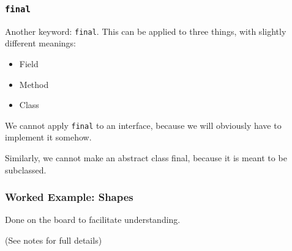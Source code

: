 \begin{frame}
\frametitle{\texttt{final}}
\begin{changemargin}{1cm}
Another keyword: \texttt{final}. This can be applied to three things, with slightly different meanings:
\begin{itemize}
	\item Field
	\item Method
	\item Class
\end{itemize}
We cannot apply \texttt{final} to an interface, because we will obviously have to implement it somehow. 

Similarly, we cannot make an abstract class final, because it is meant to be subclassed. 

\end{changemargin}
\end{frame}

\begin{frame}
\frametitle{Worked Example: Shapes}
\begin{changemargin}{1cm}
Done on the board to facilitate understanding.

(See notes for full details)

\end{changemargin}
\end{frame}

